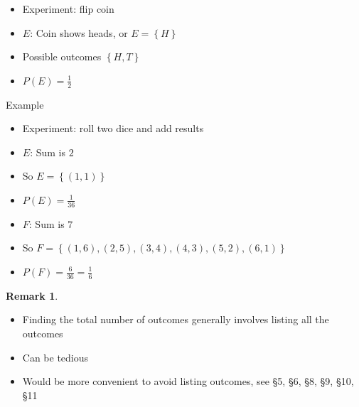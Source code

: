 \documentclass[handout]{beamer}
\theoremstyle{definition}
\newtheorem{remark}{Remark}
\begin{document}
\begin{frame}
\begin{example}
\begin{itemize}
\item Experiment: flip coin
\item $E$: Coin shows heads, or $E=\left\{H\right\}$
\item Possible outcomes $\left\{H,T\right\}$
\item $P\left(E\right)=\frac{1}{2}$
\end{itemize}
\end{example}
\end{frame}

\begin{frame}{Example}
\begin{itemize}
\item Experiment: roll two dice and add results
\item $E$: Sum is $2$
\item So $E=\left\{\left(1,1\right)\right\}$
\item $P\left(E\right)=\frac{1}{36}$
\item $F$: Sum is $7$
\item So $F=\left\{\left(1,6\right),
\left(2,5\right),\left(3,4\right),
\left(4,3\right),\left(5,2\right),\left(6,1\right)\right\}$
\item $P\left(F\right)=\frac{6}{36}=\frac{1}{6}$
\end{itemize}
\begin{remark}
\begin{itemize}
\item Finding the total number of outcomes
generally involves \alert{listing} all the outcomes
\item Can be tedious
\item Would be more convenient to avoid listing outcomes, see \S5, \S6, \S8,
\S9, \S10, \S11
\end{itemize}
\end{remark}
\end{frame}
\end{document}
